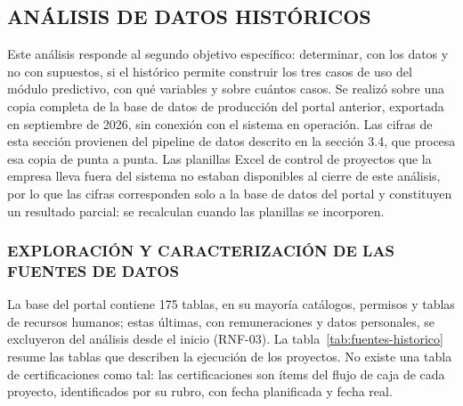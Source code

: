 \subsection{ANÁLISIS DE DATOS HISTÓRICOS}

Este análisis responde al segundo objetivo específico: determinar, con los datos y no con supuestos, si el histórico permite construir los tres casos de uso del módulo predictivo, con qué variables y sobre cuántos casos. Se realizó sobre una copia completa de la base de datos de producción del portal anterior, exportada en septiembre de 2026, sin conexión con el sistema en operación. Las cifras de esta sección provienen del pipeline de datos descrito en la sección 3.4, que procesa esa copia de punta a punta. Las planillas Excel de control de proyectos que la empresa lleva fuera del sistema no estaban disponibles al cierre de este análisis, por lo que las cifras corresponden solo a la base de datos del portal y constituyen un resultado parcial: se recalculan cuando las planillas se incorporen.

\subsubsection{EXPLORACIÓN Y CARACTERIZACIÓN DE LAS FUENTES DE DATOS}

La base del portal contiene 175 tablas, en su mayoría catálogos, permisos y tablas de recursos humanos; estas últimas, con remuneraciones y datos personales, se excluyeron del análisis desde el inicio (RNF-03). La tabla~\ref{tab:fuentes-historico} resume las tablas que describen la ejecución de los proyectos. No existe una tabla de certificaciones como tal: las certificaciones son ítems del flujo de caja de cada proyecto, identificados por su rubro, con fecha planificada y fecha real.

